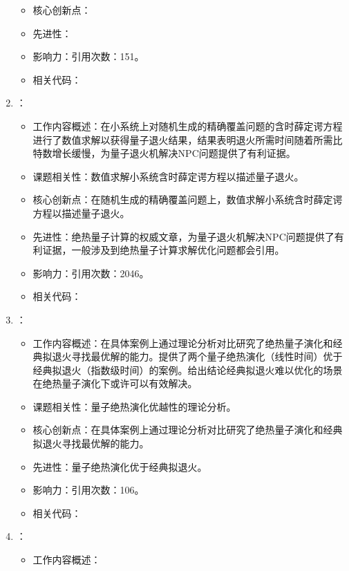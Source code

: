 \begin{enumerate}
\begin{itemize}
                \item 核心创新点：
                \item 先进性：
                \item 影响力：引用次数：151。
                \item 相关代码：
            \end{itemize}
        \item \citet{farhi2001quantum}：
        \begin{itemize}
            \item 工作内容概述：在小系统上对随机生成的精确覆盖问题的含时薛定谔方程进行了数值求解以获得量子退火结果，结果表明退火所需时间随着所需比特数增长缓慢，为量子退火机解决NPC问题提供了有利证据。
            \item 课题相关性：数值求解小系统含时薛定谔方程以描述量子退火。
            \item 核心创新点：在随机生成的精确覆盖问题上，数值求解小系统含时薛定谔方程以描述量子退火。
            \item 先进性：绝热量子计算的权威文章，为量子退火机解决NPC问题提供了有利证据，一般涉及到绝热量子计算求解优化问题都会引用。
            \item 影响力：引用次数：2046。
            \item 相关代码：
        \end{itemize}
        \item \citet{farhi2002quantum}：
            \begin{itemize}
                \item 工作内容概述：在具体案例上通过理论分析对比研究了绝热量子演化和经典拟退火寻找最优解的能力。提供了两个量子绝热演化（线性时间）优于经典拟退火（指数级时间）的案例。给出结论经典拟退火难以优化的场景在绝热量子演化下或许可以有效解决。
                \item 课题相关性：量子绝热演化优越性的理论分析。
                \item 核心创新点：在具体案例上通过理论分析对比研究了绝热量子演化和经典拟退火寻找最优解的能力。
                \item 先进性：量子绝热演化优于经典拟退火。
                \item 影响力：引用次数：106。
                \item 相关代码：
            \end{itemize}
            \item \citet{martovnak2002quantum}：
            \begin{itemize}
                \item 工作内容概述：

\end{itemize}
\end{enumerate}
